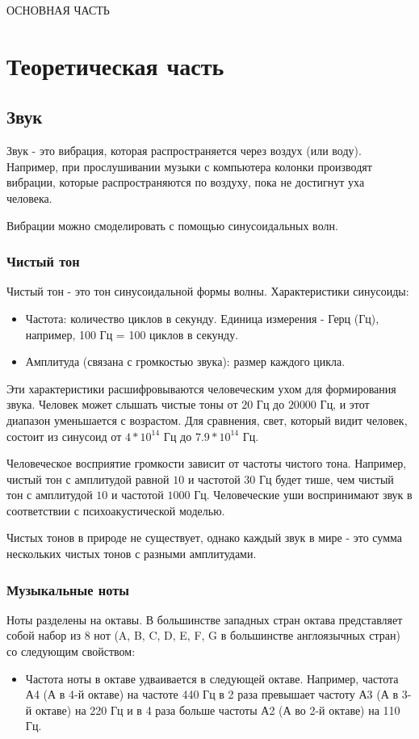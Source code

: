 \Main
\hspace{0pt}
\vfill
\begin{center}
ОСНОВНАЯ ЧАСТЬ
\end{center}
\vfill
\hspace{0pt}
\pagebreak

\chapter{Теоретическая часть}
\label{cha:ch_1}

\section{Звук}
Звук - это вибрация, которая распространяется через воздух (или воду).
Например, при прослушивании музыки с компьютера колонки производят вибрации,
которые распространяются по воздуху, пока не достигнут уха человека.

Вибрации можно смоделировать с помощью синусоидальных волн.

\subsection{Чистый тон}
Чистый тон - это тон синусоидальной формы волны. Характеристики синусоиды:
\begin{itemize}
    \item Частота: количество циклов в секунду. Единица измерения - Герц (Гц), например, 100 Гц = 100 циклов в секунду.
    \item Амплитуда (связана с громкостью звука): размер каждого цикла.
\end{itemize}

Эти характеристики расшифровываются человеческим ухом для формирования звука.
Человек может слышать чистые тоны от $20$ Гц до $20 000$ Гц,
и этот диапазон уменьшается с возрастом. Для сравнения, свет, который видит человек,
состоит из синусоид от $4 * 10^{14}$ Гц до $7.9 * 10^{14}$ Гц.

Человеческое восприятие громкости зависит от частоты чистого тона.
Например, чистый тон с амплитудой равной $10$ и частотой $30$ Гц будет тише,
чем чистый тон с амплитудой $10$ и частотой $1000$ Гц.
Человеческие уши воспринимают звук в соответствии с психоакустической моделью.

Чистых тонов в природе не существует, однако каждый звук в мире - это сумма
нескольких чистых тонов с разными амплитудами.

\subsection{Музыкальные ноты}
Ноты разделены на октавы. В большинстве западных стран октава представляет
собой набор из 8 нот (A, B, C, D, E, F, G в большинстве англоязычных
стран) со следующим свойством:
\begin{itemize}
    \item Частота ноты в октаве удваивается в следующей октаве.
    Например, частота А4 (А в 4-й октаве) на частоте 440 Гц в 2 раза
    превышает частоту А3 (А в 3-й октаве) на 220 Гц и в 4 раза больше
    частоты А2 (А во 2-й октаве) на 110 Гц.
\end{itemize}

